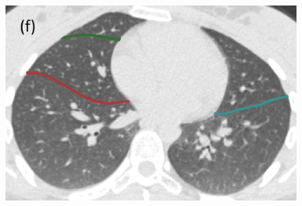 \documentclass[]{spie}  %
\begin{document}
{\begin{figure}[htbp]
\begin{subfigure}
{\begin{minipage}[t]{0.2\linewidth}
  \includegraphics[width=\linewidth,trim={{.0\wd0} {.0\wd0} {.0\wd0} {.0\wd0}},clip]{Image/H1335_FRC_PCAFissureDetection_Axial.png}
  \centerline{}
	\end{minipage}%
   }%
  \label{fig:HLASegmentationResults-f} 
\end{subfigure}
\hspace{2.8in}
\vspace{.1in}
\begin{subfigure}{
  \begin{minipage}[t]{0.2\linewidth}

\end{minipage}}
\end{subfigure}
\end{figure}}
\end{document}
